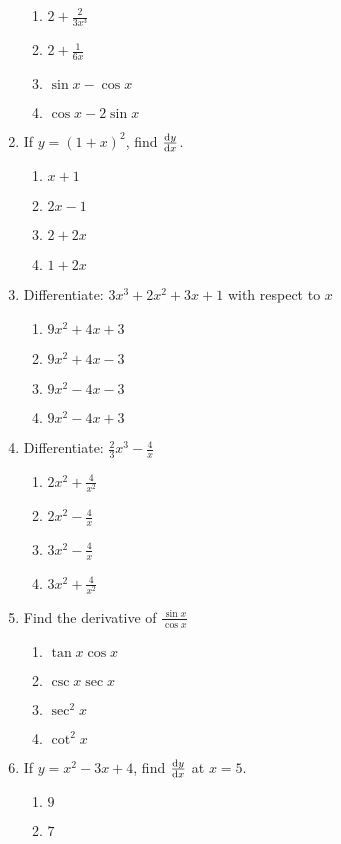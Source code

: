 \begin{multicols}{2}
\begin{enumerate}[label={\arabic*.}]
	\begin{enumerate}[label={\Alph*.}]
	\item \(2 + \frac{2}{3{x}^{3}}\)
	\item \(2 + \frac{1}{6x}\)
	\item \(\sin x - \cos x\)
	\item \(\cos x - 2\sin x\)
	\end{enumerate}
\item If \(y = (1+x)^{2}\), find \( \dv{y}{x} \).
	\begin{enumerate}[label={\Alph*.}]
	\item \(x+1\)
	\item \(2x-1\)
	\item \(2 + 2x\)
	\item \(1+2x\)
	\end{enumerate}
\item Differentiate: \(3x^3+2x^2+3x+1\) with respect to \(x\)
	\begin{enumerate}[label={\Alph*.}]
	\item \(9x^2+4x+3\)
	\item \(9x^2+4x-3\)
	\item \(9x^2-4x-3\)
	\item \(9x^2-4x+3\)
	\end{enumerate}
\item Differentiate: \(\frac{2}{3}x^{3}-\frac{4}{x}\)
	\begin{enumerate}[label={\Alph*.}]
	\item \(2x^2 + \frac{4}{x^2}\)
	\item \(2x^{2}-\frac{4}{x}\)
	\item \(3x^{2}-\frac{4}{x}\)
	\item \(3x^{2}+\frac{4}{x^2}\)
	\end{enumerate}
\item Find the derivative of \(\frac{\sin {x}}{\cos {x}}\)
	\begin{enumerate}[label={\Alph*.}]
	\item \(\tan{x}\cos{x}\)
	\item \(\csc{x}\sec{x}\)
	\item \(\sec^{2}{x}\)
	\item \(\cot^{2}{x}\)
	\end{enumerate}
\item If \(y=x^2-3x+4\), find \(\dv{y}{x}\) at \(x=5\).
	\begin{enumerate}[label={\Alph*.}]
	\item \(9\)
	\item \(7\)

\end{enumerate}
\end{enumerate}
\end{multicols}
